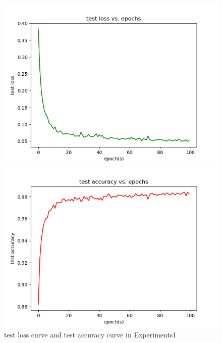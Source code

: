 \documentclass{elegantbook}
\begin{document}
\begin{figure}[!h]
	\centering
	\begin{minipage}[t]{0.48\textwidth}
		\centering
		\includegraphics[width=\textwidth]{../results/testloss1}
	\end{minipage}
	\begin{minipage}[t]{0.48\textwidth}
		\centering
		\includegraphics[width=\textwidth]{../results/testacc1}
	\end{minipage}
	\caption{\label{testres1}test loss curve and test accuracy curve in Experiments1}
\end{figure}
\end{document}
